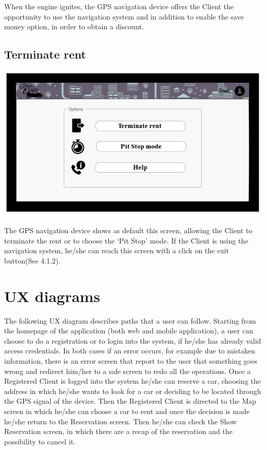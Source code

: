 When the engine ignites, the GPS navigation device offers the Client the opportunity to use the navigation system and in addition to enable the save money option, in order to obtain a discount.

\subsection{Terminate rent}

\includegraphics[width=\textwidth, keepaspectratio]{../images/mockups/terminate_rent.png}

The GPS navigation device shows as default this screen, allowing the Client to terminate the rent or to choose the ‘Pit Stop’ mode.
If the Client is using the navigation system, he/she can reach this screen with a click on the exit button(See 4.1.2).

\section{UX diagrams}
The following UX diagram describes paths that a user can follow.
Starting from the homepage of the application (both web and mobile application), a user can choose to do a registration or to login into the system, if he/she has already valid access credentials.
In both cases if an error occurs, for example due to mistaken information, there is an error screen that report to the user that something goes wrong and redirect him/her to a safe screen to redo all the operations.
Once a Registered Client is logged into the system he/she can reserve a car, choosing the address in which he/she wants to look for a car or deciding to be located through the GPS signal of the device.
Then the Registered Client is directed to the Map screen in which he/she can choose a car to rent and once the decision is made he/she return to the Reservation screen.
Then he/she can check the Show Reservation screen, in which there are a recap of the reservation and the possibility to cancel it.

